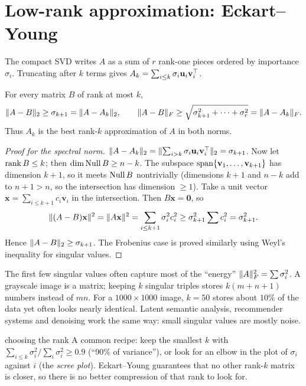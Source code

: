 \section{Low-rank approximation: Eckart--Young}

The compact SVD writes $A$ as a sum of $r$ rank-one pieces ordered by importance $\sigma_i$. Truncating after $k$ terms gives $A_k=\sum_{i\le k}\sigma_i\mathbf{u}_i\mathbf{v}_i^{\top}$.

\begin{theorem}\label{thm:eckart}
For every matrix $B$ of rank at most $k$,
\[ \lVert A-B\rVert_2\ge\sigma_{k+1}=\lVert A-A_k\rVert_2,\qquad\lVert A-B\rVert_F\ge\sqrt{\sigma_{k+1}^2+\dots+\sigma_r^2}=\lVert A-A_k\rVert_F. \]
Thus $A_k$ is the best rank-$k$ approximation of $A$ in both norms.
\end{theorem}

\begin{proof}[Proof for the spectral norm]
$\lVert A-A_k\rVert_2=\lVert\sum_{i>k}\sigma_i\mathbf{u}_i\mathbf{v}_i^{\top}\rVert_2=\sigma_{k+1}$. Now let $\operatorname{rank} B\le k$; then $\dim\operatorname{Null} B\ge n-k$. The subspace $\operatorname{span}\{\mathbf{v}_1,\dots,\mathbf{v}_{k+1}\}$ has dimension $k+1$, so it meets $\operatorname{Null} B$ nontrivially (dimensions $k+1$ and $n-k$ add to $n+1>n$, so the intersection has dimension $\ge1$). Take a unit vector $\mathbf{x}=\sum_{i\le k+1}c_i\mathbf{v}_i$ in the intersection. Then $B\mathbf{x}=\mathbf{0}$, so
\[ \lVert(A-B)\mathbf{x}\rVert^2=\lVert A\mathbf{x}\rVert^2=\sum_{i\le k+1}\sigma_i^2c_i^2\ge\sigma_{k+1}^2\sum c_i^2=\sigma_{k+1}^2. \]
Hence $\lVert A-B\rVert_2\ge\sigma_{k+1}$. The Frobenius case is proved similarly using Weyl's inequality for singular values.
\end{proof}

\begin{intuition}
The first few singular values often capture most of the ``energy'' $\lVert A\rVert_F^2=\sum\sigma_i^2$. A grayscale image is a matrix; keeping $k$ singular triples stores $k(m+n+1)$ numbers instead of $mn$. For a $1000\times1000$ image, $k=50$ stores about $10\%$ of the data yet often looks nearly identical. Latent semantic analysis, recommender systems and denoising work the same way: small singular values are mostly noise.
\end{intuition}

\begin{interview}{choosing the rank}
A common recipe: keep the smallest $k$ with $\sum_{i\le k}\sigma_i^2/\sum_i\sigma_i^2\ge0.9$ (``90\% of variance''), or look for an elbow in the plot of $\sigma_i$ against $i$ (the \emph{scree plot}). Eckart--Young guarantees that no other rank-$k$ matrix is closer, so there is no better compression of that rank to look for.
\end{interview}

